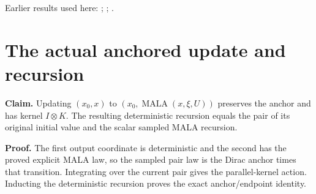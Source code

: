 \documentclass[11pt,a4paper]{article}
\begin{document}
Earlier results used here: \cite[Section~3.33.5]{LangevinLean2026ULASC}; \cite[Section~3.36.12]{LangevinLean2026ULASC}; \cite[Section~3.36.9]{LangevinLean2026ULASC}.

\section{\texorpdfstring{The actual anchored update and recursion}{The actual anchored update and recursion}}


\textbf{Claim.} Updating \((x_0,x)\) to \((x_0,\operatorname{MALA}(x,\xi,U))\) preserves the anchor and has kernel \(I\otimes K\). The resulting deterministic recursion equals the pair of its original initial value and the scalar sampled MALA recursion.



\textbf{Proof.} The first output coordinate is deterministic and the second has the proved explicit MALA law, so the sampled pair law is the Dirac anchor times that transition. Integrating over the current pair gives the parallel-kernel action. Inducting the deterministic recursion proves the exact anchor/\allowbreak{}endpoint identity.
\end{document}
